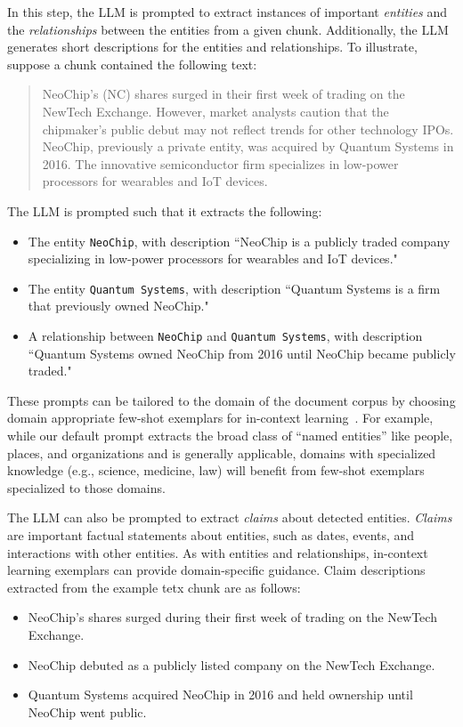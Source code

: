 \documentclass{article}
\begin{document}
In this step, the LLM is prompted to extract instances of important \emph{entities} and the \emph{relationships} between the entities from a given chunk. 
Additionally, the LLM generates short descriptions for the entities and relationships. To illustrate, suppose a chunk contained the following text:

\begin{quote}
NeoChip's (NC) shares surged in their first week of trading on the NewTech Exchange.
However, market analysts caution that the chipmaker's public debut may not reflect trends for other technology IPOs.
NeoChip, previously a private entity, was acquired by Quantum Systems in 2016.
The innovative semiconductor firm specializes in low-power processors for wearables and IoT devices.
\end{quote}

The LLM is prompted such that it extracts the following:
\begin{itemize}
    \item The entity \texttt{NeoChip}, with description ``NeoChip is a publicly traded company specializing in low-power processors for wearables and IoT devices."
    \item The entity \texttt{Quantum Systems}, with description ``Quantum Systems is a firm that previously owned NeoChip."
    \item A relationship between \texttt{NeoChip} and \texttt{Quantum Systems}, with description ``Quantum Systems owned NeoChip from 2016 until NeoChip became publicly traded."
\end{itemize}
These prompts can be tailored to the domain of the document corpus by choosing domain appropriate few-shot exemplars for in-context learning~\citep{brown2020language}.
For example, while our default prompt extracts the broad class of ``named entities'' like people, places, and organizations and is generally applicable, domains with specialized knowledge (e.g., science, medicine, law) will benefit from few-shot exemplars specialized to those domains.

The LLM can also be prompted to extract \emph{claims} about detected entities.
\emph{Claims} are important factual statements about entities, such as dates, events, and interactions with other entities.
As with entities and relationships, in-context learning exemplars can provide domain-specific guidance. Claim descriptions extracted from the example tetx chunk are as follows:
\begin{itemize}
    \item NeoChip's shares surged during their first week of trading on the NewTech Exchange.
    \item NeoChip debuted as a publicly listed company on the NewTech Exchange.
    \item Quantum Systems acquired NeoChip in 2016 and held ownership until NeoChip went public.
\end{itemize}
\end{document}
